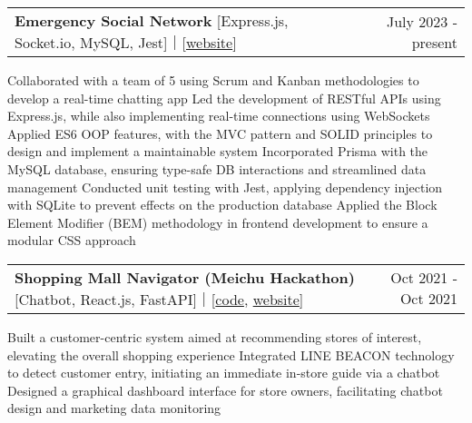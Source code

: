\newcommand{\resumeProjEntry}[3]{
    \vspace{5pt}\item
      \begin{tabular*}{0.97\textwidth}{l@{\extracolsep{\fill}}r}
        \textbf{#1} #2 & \small #3\\
      \end{tabular*}\vspace{-5pt}
}

\resumeProjEntry
{Emergency Social Network}
{[Express.js, Socket.io, MySQL, Jest]｜[\href{https://fse-chat.glitch.me}{website}]}
{July 2023 - present}
{
    \resumeItemListStart
        \resumeItem
        {Collaborated with a team of 5 using Scrum and Kanban methodologies to develop a real-time chatting app}
        \resumeItem
        {Led the development of RESTful APIs using Express.js, while also implementing real-time connections using WebSockets}
        \resumeItem
        {Applied ES6 OOP features, with the MVC pattern and SOLID principles to design and implement a maintainable system}
        \resumeItem
        {Incorporated Prisma with the MySQL database, ensuring type-safe DB interactions and streamlined data management}
        \resumeItem
        {Conducted unit testing with Jest, applying dependency injection with SQLite to prevent effects on the production database}
        \resumeItem
        {Applied the Block Element Modifier (BEM) methodology in frontend development to ensure a modular CSS approach}
    \resumeItemListEnd
}

\resumeProjEntry
{Shopping Mall Navigator (Meichu Hackathon)}
{[Chatbot, React.js, FastAPI]｜[\href{https://github.com/OscarShiang/meichu-stack}{code}, \href{https://line-tv.kuouu.tw}{website}]}
{Oct 2021 - Oct 2021}
{
    \resumeItemListStart
        \resumeItem
        {Built a customer-centric system aimed at recommending stores of interest, elevating the overall shopping experience}
        \resumeItem
        {Integrated LINE BEACON technology to detect customer entry, initiating an immediate in-store guide via a chatbot}
        \resumeItem
        {Designed a graphical dashboard interface for store owners, facilitating chatbot design and marketing data monitoring}
    \resumeItemListEnd
}


